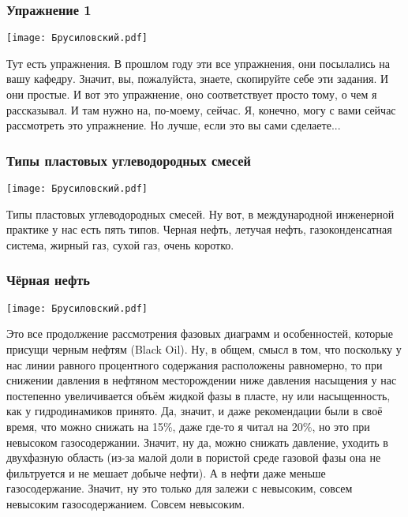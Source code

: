 \documentclass[main.tex]{subfiles}
\begin{document}
\subsubsection{Упражнение 1}

\begin{center}
\texttt{[image: Брусиловский.pdf]}
\end{center}

Тут есть упражнения.
В прошлом году эти все упражнения, они посылались на вашу
кафедру.
Значит, вы, пожалуйста, знаете, скопируйте себе эти задания.
И они простые.
И вот это упражнение, оно соответствует просто тому, о чем я рассказывал.
И там нужно на, по-моему, сейчас.
Я, конечно, могу с вами сейчас рассмотреть это упражнение.
Но лучше, если это вы сами сделаете...

\subsubsection{Типы пластовых углеводородных смесей}

\begin{center}
\texttt{[image: Брусиловский.pdf]}
\end{center}

Типы пластовых углеводородных смесей.
Ну вот, в международной инженерной практике у нас есть пять типов.
Черная нефть, летучая нефть, газоконденсатная система, жирный газ, сухой газ, очень коротко.

\subsubsection{Чёрная нефть}

\begin{center}
\texttt{[image: Брусиловский.pdf]}
\end{center}

Это все продолжение рассмотрения фазовых диаграмм и особенностей, которые присущи черным нефтям (Black Oil).
Ну, в общем, смысл в том, что поскольку у нас линии равного процентного содержания расположены равномерно, то при снижении давления в нефтяном месторождении ниже давления насыщения у нас постепенно увеличивается объём жидкой фазы в пласте, ну или насыщенность, как у гидродинамиков принято.
Да, значит, и даже рекомендации были в своё время, что можно снижать на 15\%, даже где-то я читал на 20\%, но это при невысоком газосодержании.
Значит, ну да, можно снижать давление, уходить в двухфазную область (из-за малой доли в пористой среде газовой фазы она не фильтруется и не мешает добыче нефти).
А в нефти даже меньше газосодержание.
Значит, ну это только для залежи с невысоким, совсем невысоким газосодержанием.
Совсем невысоким.
\end{document}
